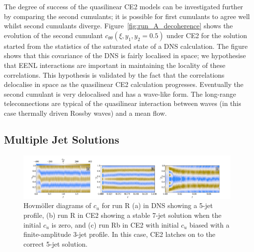 \documentclass{jfm}
\newcommand{\cu}{c_u}
\newcommand{\ctt}{c_{\theta \theta}}
\begin{document}
The degree of success of the quasilinear CE2 models can be investigated further by comparing the second cumulants; it is possible for first cumulants to agree well whilst second cumulants diverge. Figure~\ref{fig:run_A_decoherence} shows the evolution of the second cumulant $\ctt(\xi, y_1, y_2 = 0.5)$ under CE2 for the solution started from the statistics of the saturated state of a DNS calculation. The figure shows that this covariance of the DNS is fairly localised in space; we hypothesise that EENL interactions are important in maintaining the locality of these correlations. This hypothesis is validated by the fact that the correlations delocalise in space as the quasilinear CE2 calculation progresses. Eventually the second cumulant is very delocalised and has a wave-like form. The long-range teleconnections are typical of the quasilinear interaction between waves (in this case thermally driven Rossby waves) and a mean flow.

\subsection{Multiple Jet Solutions}
\begin{figure}
  \centering
  \includegraphics[width=\textwidth]{run_R_S_hov_cu_dns_ce2.pdf}
  \caption{Hovm\"oller diagrams of $\cu$ for run R (a) in DNS showing a 5-jet profile, (b) run R in CE2 showing a stable 7-jet solution when the initial $\cu$ is zero, and (c) run Rb in CE2 with initial $\cu$ biased with a finite-amplitude 3-jet profile. In this case, CE2 latches on to the correct 5-jet solution.}
  \label{fig:hov_run_R}
\end{figure}
\end{document}
